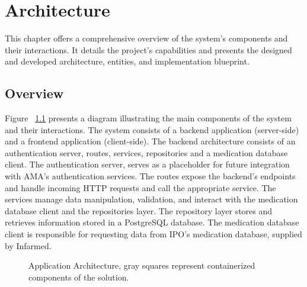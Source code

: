 %
%
\chapter{Architecture} \label{cap:architecture}

This chapter offers a comprehensive overview of the system's components and their interactions. It details the project's capabilities and presents the designed and developed architecture, entities, and implementation blueprint.

\section{Overview}

Figure ~\ref{fig:architecture} presents a diagram illustrating the main components of the system and their interactions. The system consists of a backend application (server-side) and a frontend application (client-side).
The backend architecture consists of an authentication server, routes, services, repositories and a medication database client.
The authentication server,  serves as a placeholder for future integration with AMA's authentication services.
The routes expose the backend's endpoints and handle incoming HTTP requests and call the appropriate service.
The services manage data manipulation, validation, and interact with the medication database client and the repositories layer.
The repository layer stores and retrieves information stored in a PostgreSQL database.
The medication database client is responsible for requesting data from IPO's medication database, supplied by Infarmed.


\begin{figure}[H]
	\begin{center}
	\end{center}
	\caption{Application Architecture, gray squares represent containerized components of the solution.}\label{fig:architecture}
\end{figure}






